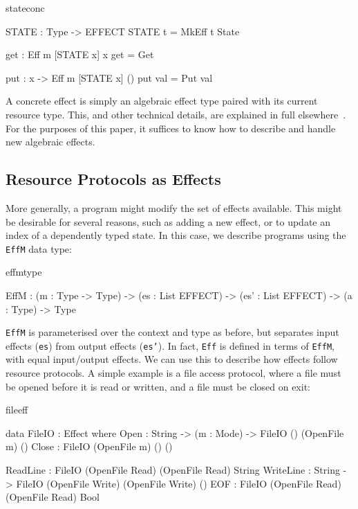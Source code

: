 \begin{SaveVerbatim}{stateconc}

STATE : Type -> EFFECT
STATE t = MkEff t State

get : Eff m [STATE x] x
get = Get 

put : x -> Eff m [STATE x] ()
put val = Put val

\end{SaveVerbatim}

A concrete effect is simply an algebraic effect type paired with its current
resource type. This, and other
technical details, are explained in full elsewhere~\cite{brady:effects}.
For the purposes of this paper, it suffices to know how to describe and
handle new algebraic effects.

\subsection{Resource Protocols as Effects}

More generally, a program might modify the set of effects available.
This might be desirable for several reasons, such as adding a new
effect, or to update an index of a dependently typed state. In this
case, we describe programs using the \texttt{EffM} data type:

\begin{SaveVerbatim}{effmtype}

EffM : (m : Type -> Type) ->
       (es : List EFFECT) -> (es' : List EFFECT) ->
       (a : Type) -> Type

\end{SaveVerbatim}

\noindent
\texttt{EffM} is parameterised over the context and type as before, but
separates input effects (\texttt{es}) from output effects (\texttt{es'}). 
In fact, \texttt{Eff}
is defined in terms of \texttt{EffM}, with equal input/output effects.
We can use this to describe how effects follow resource protocols. A simple
example is a file access protocol, where a file must be opened before it
is read or written, and a file must be closed on exit:

\begin{SaveVerbatim}{fileeff}

data FileIO : Effect where
     Open  : String -> (m : Mode) -> 
             FileIO () (OpenFile m) ()
     Close : FileIO (OpenFile m) () ()

     ReadLine  : FileIO (OpenFile Read)  
                        (OpenFile Read) String
     WriteLine : String -> 
                 FileIO (OpenFile Write) 
                        (OpenFile Write) ()
     EOF       : FileIO (OpenFile Read)  
                        (OpenFile Read) Bool

\end{SaveVerbatim}

